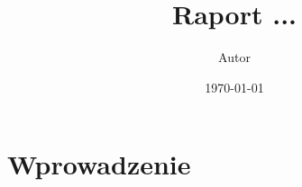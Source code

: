\documentclass{article}
\title{Raport ...}
\author{Autor}
\date{\today}
\begin{document}
\maketitle

\section{Wprowadzenie}


\end{document}
